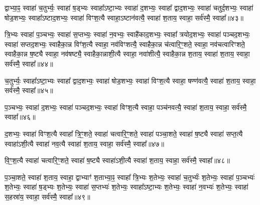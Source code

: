 {\anuvakamend[{एक॑स्मै त्रि॒भ्यः प॑ञ्चा॒शत्॥12॥}]}

द्वाभ्या॒ꣴ॒ स्वाहा॑ च॒तुर्भ्यः॒ स्वाहा॑ ष॒ड्भ्यः स्वाहा᳚\-ऽष्टा॒भ्यः स्वाहा॑ द॒शभ्यः॒ स्वाहा᳚ द्वाद॒शभ्यः॒ स्वाहा॑ चतुर्द॒शभ्यः॒ स्वाहा॑ षोड॒शभ्यः॒ स्वाहा᳚\-ऽष्टाद॒शभ्यः॒ स्वाहा॑ विꣳश॒त्यै स्वाहा॒\-ऽष्टान॑वत्यै॒ स्वाहा॑ श॒ताय॒ स्वाहा॒ सर्व॑स्मै॒ स्वाहा᳚॥४३॥

{\anuvakamend[{द्वाभ्या॑म॒ष्टान॑वत्यै॒ षड्विꣳ॑शतिः॥13॥}]}

त्रि॒भ्यः स्वाहा॑ प॒ञ्चभ्यः॒ स्वाहा॑ स॒प्तभ्यः॒ स्वाहा॑ न॒वभ्यः॒ स्वाहै॑काद॒शभ्यः॒ स्वाहा᳚ त्रयोद॒शभ्यः॒ स्वाहा॑ पञ्चद॒शभ्यः॒ स्वाहा॑ सप्तद॒शभ्यः॒ स्वाहैका॒न्न विꣳ॑श॒त्यै स्वाहा॒ नव॑विꣳशत्यै॒ स्वाहैका॒न्न च॑त्वारि॒ꣳ॒शते॒ स्वाहा॒ नव॑चत्वारिꣳशते॒ स्वाहैका॒न्न ष॒ष्ट्यै स्वाहा॒ नव॑षष्ट्यै॒ स्वाहैका॒न्नाशी॒त्यै स्वाहा॒ नवा॑शीत्यै॒ स्वाहैका॒न्न श॒ताय॒ स्वाहा॑ श॒ताय॒ स्वाहा॒ सर्व॑स्मै॒ स्वाहा᳚॥४४॥

{\anuvakamend[{त्रि॒भ्यो᳚\-ऽष्टाचत्वारि॒ꣳ॒शत्॥14॥}]}

च॒तुर्भ्यः॒ स्वाहा᳚\-ऽष्टा॒भ्यः स्वाहा᳚ द्वाद॒शभ्यः॒ स्वाहा॑ षोड॒शभ्यः॒ स्वाहा॑ विꣳश॒त्यै स्वाहा॒ षण्ण॑वत्यै॒ स्वाहा॑ श॒ताय॒ स्वाहा॒ सर्व॑स्मै॒ स्वाहा᳚॥४५॥

{\anuvakamend[{च॒तुर्भ्यः॒ षण्ण॑वत्यै॒ षोड॑श॥15॥}]}

प॒ञ्चभ्यः॒ स्वाहा॑ द॒शभ्यः॒ स्वाहा॑ पञ्चद॒शभ्यः॒ स्वाहा॑ विꣳश॒त्यै स्वाहा॒ पञ्च॑नवत्यै॒ स्वाहा॑ श॒ताय॒ स्वाहा॒ सर्व॑स्मै॒ स्वाहा᳚॥४६॥

{\anuvakamend[{प॒ञ्चभ्यः॒ प़ञ्च॑नवत्यै॒ चतु॑र्दश॥16॥}]}

द॒शभ्यः॒ स्वाहा॑ विꣳश॒त्यै स्वाहा᳚ त्रि॒ꣳ॒शते॒ स्वाहा॑ चत्वारि॒ꣳ॒शते॒ स्वाहा॑ पञ्चा॒शते॒ स्वाहा॑ ष॒ष्ट्यै स्वाहा॑ सप्त॒त्यै स्वाहा॑\-ऽशी॒त्यै स्वाहा॑ नव॒त्यै स्वाहा॑ श॒ताय॒ स्वाहा॒ सर्व॑स्मै॒ स्वाहा᳚॥४७॥

{\anuvakamend[{द॒शभ्यो॒ द्वाविꣳ॑शतिः॥17॥}]}

वि॒ꣳ॒श॒त्यै स्वाहा॑ चत्वारि॒ꣳ॒शते॒ स्वाहा॑ ष॒ष्ट्यै स्वाहा॑\-ऽशी॒त्यै स्वाहा॑ श॒ताय॒ स्वाहा॒ सर्व॑स्मै॒ स्वाहा᳚॥४८॥

{\anuvakamend[{वि॒ꣳ॒श॒त्यै द्वाद॑श॥18॥}]}

प॒ञ्चा॒शते॒ स्वाहा॑ श॒ताय॒ स्वाहा॒ द्वाभ्याꣳ॑ श॒ताभ्या॒ꣴ॒ स्वाहा᳚ त्रि॒भ्यः श॒तेभ्यः॒ स्वाहा॑ च॒तुर्भ्यः॑ श॒तेभ्यः॒ स्वाहा॑ प॒ञ्चभ्यः॑ श॒तेभ्यः॒ स्वाहा॑ ष॒ड्भ्यः श॒तेभ्यः॒ स्वाहा॑ स॒प्तभ्यः॑ श॒तेभ्यः॒ स्वाहा᳚\-ऽष्टा॒भ्यः श॒तेभ्यः॒ स्वाहा॑ न॒वभ्यः॑ श॒तेभ्यः॒ स्वाहा॑ स॒हस्रा॑य॒ स्वाहा॒ सर्व॑स्मै॒ स्वाहा᳚॥४९॥


